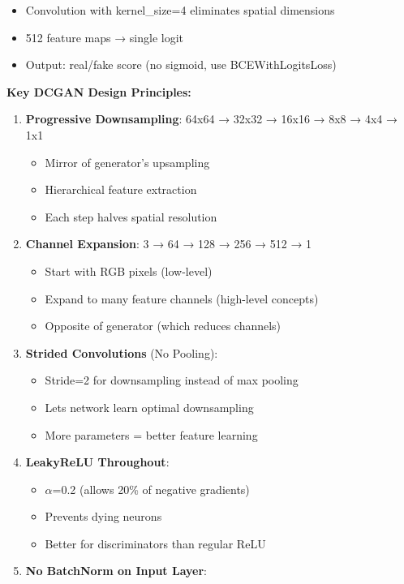 \documentclass[11pt]{article}
\providecommand{\tightlist}{%
      \setlength{\itemsep}{0pt}\setlength{\parskip}{0pt}}
\begin{document}
\begin{enumerate}
  \begin{itemize}
  \tightlist
  \item
    Convolution with kernel\_size=4 eliminates spatial dimensions
  \item
    512 feature maps → single logit
  \item
    Output: real/fake score (no sigmoid, use BCEWithLogitsLoss)
  \end{itemize}
\end{enumerate}

\textbf{Key DCGAN Design Principles:}

\begin{enumerate}
\def\labelenumi{\arabic{enumi}.}
\tightlist
\item
  \textbf{Progressive Downsampling}: 64x64 → 32x32 → 16x16 → 8x8 → 4x4 →
  1x1

  \begin{itemize}
  \tightlist
  \item
    Mirror of generator's upsampling
  \item
    Hierarchical feature extraction
  \item
    Each step halves spatial resolution
  \end{itemize}
\item
  \textbf{Channel Expansion}: 3 → 64 → 128 → 256 → 512 → 1

  \begin{itemize}
  \tightlist
  \item
    Start with RGB pixels (low-level)
  \item
    Expand to many feature channels (high-level concepts)
  \item
    Opposite of generator (which reduces channels)
  \end{itemize}
\item
  \textbf{Strided Convolutions} (No Pooling):

  \begin{itemize}
  \tightlist
  \item
    Stride=2 for downsampling instead of max pooling
  \item
    Lets network learn optimal downsampling
  \item
    More parameters = better feature learning
  \end{itemize}
\item
  \textbf{LeakyReLU Throughout}:

  \begin{itemize}
  \tightlist
  \item
    \(\alpha\)=0.2 (allows 20\% of negative gradients)
  \item
    Prevents dying neurons
  \item
    Better for discriminators than regular ReLU
  \end{itemize}
\item
  \textbf{No BatchNorm on Input Layer}:


\end{enumerate}
\end{document}
